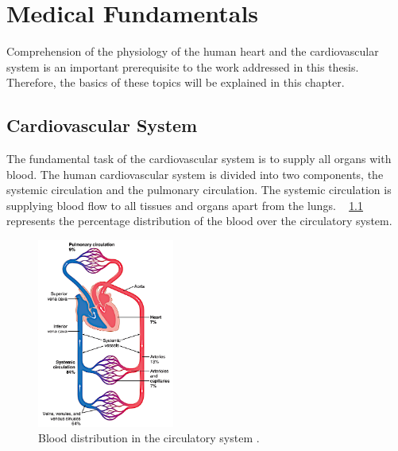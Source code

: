 \chapter{Medical Fundamentals}
Comprehension of the physiology of the human heart and the cardiovascular system is an important prerequisite to the work addressed in this thesis. Therefore, the basics of these topics will be explained in this chapter.

\section{Cardiovascular System}
The fundamental task of the cardiovascular system is to supply all organs with blood. The human cardiovascular system is divided into two components, the systemic circulation and the pulmonary circulation. The systemic circulation is supplying blood flow to all tissues and organs apart from the lungs. \figurename~ \ref{fig:circulation} represents the percentage distribution of the blood over the circulatory system. \cite{GH20}
\begin{figure}[h]
  \centering
  \includegraphics[width=0.4\textwidth, height=0.6\textwidth]{images/circulation.jpg}
  \caption[Blood distribution in the ciculatory system]{Blood distribution in the circulatory system \cite{GH20}.}
  \label{fig:circulation}
\end{figure}
